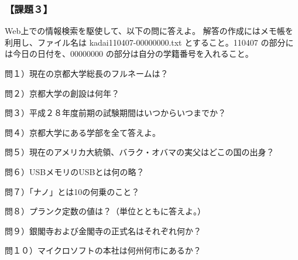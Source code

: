 \subsubsection{【課題３】}
Web上での情報検索を駆使して、以下の問に答えよ。
解答の作成にはメモ帳を利用し、ファイル名は kadai110407-00000000.txt とすること。110407 の部分には今日の日付を、00000000 の部分は自分の学籍番号を入れること。

問１）現在の京都大学総長のフルネームは？

問２）京都大学の創設は何年？

問３）平成２８年度前期の試験期間はいつからいつまでか？

問４）京都大学にある学部を全て答えよ。

問５）現在のアメリカ大統領、バラク・オバマの実父はどこの国の出身？

問６）USBメモリのUSBとは何の略？

問７）「ナノ」とは10の何乗のこと？

問８）プランク定数の値は？（単位とともに答えよ。）

問９）銀閣寺および金閣寺の正式名はそれぞれ何か？

問１０）マイクロソフトの本社は何州何市にあるか？
